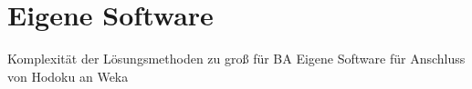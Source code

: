 \section{Eigene Software}
Komplexität der Lösungsmethoden zu groß für BA
Eigene Software für Anschluss von Hodoku an Weka